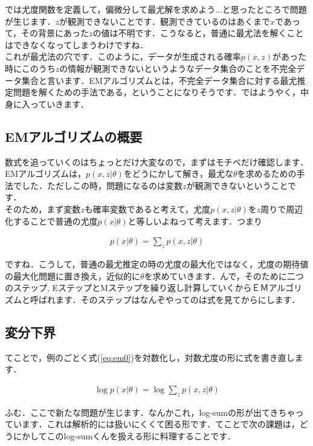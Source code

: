 \documentclass[11pt,a4paper,dvipdfmx]{ujreport}
\begin{document}
では尤度関数を定義して，偏微分して最尤解を求めよう...と思ったところで問題が生じます．$z$が観測できないことです．観測できているのはあくまで$x$であって，その背景にあった$z$の値は不明です．こうなると，普通に最尤法を解くことはできなくなってしまうわけですね．\\

これが最尤法の穴です．このように，データが生成される確率$p(x,z)$があった時にこのうち$z$の情報が観測できないというようなデータ集合のことを不完全データ集合と言います．EMアルゴリズムとは，不完全データ集合に対する最尤推定問題を解くための手法である，ということになりそうです．ではようやく，中身に入っていきます．

\subsection{EMアルゴリズムの概要}
数式を追っていくのはちょっとだけ大変なので，まずはモチベだけ確認します．EMアルゴリズムは，$p(x,z|\theta)$をどうにかして解き，最尤な$\theta$を求めるための手法でした．ただしこの時，問題になるのは変数$z$が観測できないということです．\\

そのため，まず変数$z$も確率変数であると考えて，尤度$p(x,z|\theta)$を$z$周りで周辺化することで普通の尤度$p(x|\theta)$と等しいよねって考えます．つまり

\begin{align}
  \label{eq:em0}
  p(x|\theta) = \sum_z p(x,z|\theta)
\end{align}

ですね．こうして，普通の最尤推定の時の尤度の最大化ではなく，尤度の期待値の最大化問題に置き換え，近似的に$\theta$を求めていきます．んで，そのために二つのステップ, EステップとMステップを繰り返し計算していくからＥＭアルゴリズムと呼ばれます．そのステップはなんぞやってのは式を見てからにします．

\subsection{変分下界}
てことで，例のごとく式(\ref{eq:em0})を対数化し，対数尤度の形に式を書き直します．

\begin{align}
  \label{eq:em1}
  \log p(x|\theta) = \log \sum_z p(x,z|\theta)
\end{align}

ふむ．ここで新たな問題が生じます．なんかこれ，log-sumの形が出てきちゃっています．これは解析的には扱いにくくて困る形です．てことで次の課題は，どうにかしてこのlog-sumくんを扱える形に料理することです．\\
\end{document}
